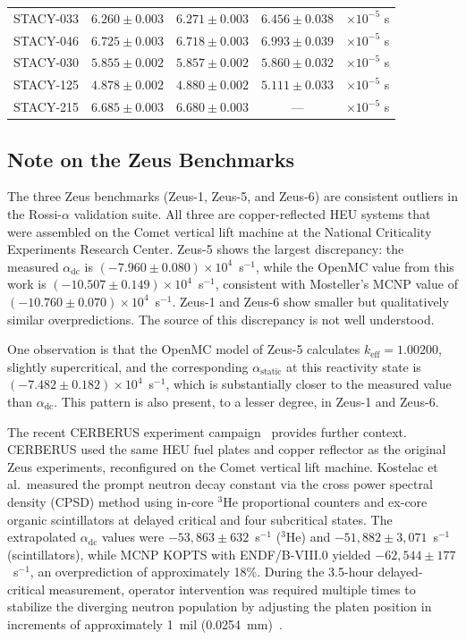 \documentclass[12pt,preprint]{elsarticle}
\begin{document}
\begin{table}[H]
\begin{tabular}{@{}lcccl@{}}
STACY-033    & $6.260 \pm 0.003$ & $6.271 \pm 0.003$      & $6.456 \pm 0.038$      & $\times 10^{-5}$ s \\
STACY-046    & $6.725 \pm 0.003$ & $6.718 \pm 0.003$      & $6.993 \pm 0.039$      & $\times 10^{-5}$ s \\
STACY-030    & $5.855 \pm 0.002$ & $5.857 \pm 0.002$      & $5.860 \pm 0.032$      & $\times 10^{-5}$ s \\
STACY-125    & $4.878 \pm 0.002$ & $4.880 \pm 0.002$      & $5.111 \pm 0.033$      & $\times 10^{-5}$ s \\
STACY-215    & $6.685 \pm 0.003$ & $6.680 \pm 0.003$      & ---                    & $\times 10^{-5}$ s \\
\bottomrule
\end{tabular}
\end{table}


\subsection{Note on the Zeus Benchmarks}\label{sec:zeus}

The three Zeus benchmarks (Zeus-1, Zeus-5, and Zeus-6) are consistent outliers in the Rossi-$\alpha$ validation suite. All three are copper-reflected HEU systems that were assembled on the Comet vertical lift machine at the National Criticality Experiments Research Center. Zeus-5 shows the largest discrepancy: the measured $\alpha_{\mathrm{dc}}$ is $(-7.960 \pm 0.080) \times 10^4$~s$^{-1}$, while the OpenMC value from this work is $(-10.507 \pm 0.149) \times 10^4$~s$^{-1}$, consistent with Mosteller's MCNP value of $(-10.760 \pm 0.070) \times 10^4$~s$^{-1}$. Zeus-1 and Zeus-6 show smaller but qualitatively similar overpredictions. The source of this discrepancy is not well understood.

One observation is that the OpenMC model of Zeus-5 calculates $k_{\mathrm{eff}} = 1.00200$, slightly supercritical, and the corresponding $\alpha_{\mathrm{static}}$ at this reactivity state is $(-7.482 \pm 0.182) \times 10^4$~s$^{-1}$, which is substantially closer to the measured value than $\alpha_{\mathrm{dc}}$. This pattern is also present, to a lesser degree, in Zeus-1 and Zeus-6.

The recent CERBERUS experiment campaign~\cite{kostelac2026} provides further context. CERBERUS used the same HEU fuel plates and copper reflector as the original Zeus experiments, reconfigured on the Comet vertical lift machine. Kostelac et al.\ measured the prompt neutron decay constant via the cross power spectral density (CPSD) method using in-core $^3$He proportional counters and ex-core organic scintillators at delayed critical and four subcritical states. The extrapolated $\alpha_{\mathrm{dc}}$ values were $-53{,}863 \pm 632$~s$^{-1}$ ($^3$He) and $-51{,}882 \pm 3{,}071$~s$^{-1}$ (scintillators), while MCNP KOPTS with ENDF/B-VIII.0 yielded $-62{,}544 \pm 177$~s$^{-1}$, an overprediction of approximately 18\%. During the 3.5-hour delayed-critical measurement, operator intervention was required multiple times to stabilize the diverging neutron population by adjusting the platen position in increments of approximately 1~mil (0.0254~mm)~\cite{kostelac2026}.
\end{document}
